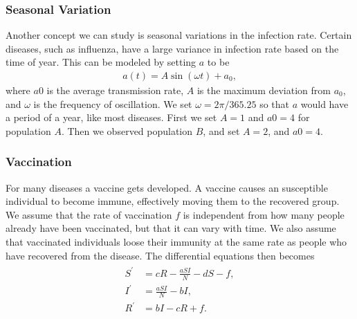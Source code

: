 \documentclass[a4paper]{article}
\let\Oldsubsubsection\subsubsection
\renewcommand{\subsubsection}{\FloatBarrier\Oldsubsubsection}
\begin{document}
	
	\subsubsection{Seasonal Variation}
	
	Another concept we can study is seasonal variations in the infection rate. Certain diseases, such as influenza, have a large variance in infection rate based on the time of year. This can be modeled by setting $a$ to be
	\begin{align}
	a ( t ) = A \sin ( \omega t ) + a _ { 0 },
	\end{align}
	where $a0$ is the average transmission rate, $A$ is the maximum deviation from $a_0$, and $\omega$ is the frequency of oscillation. We set $\omega = 2 \pi/365.25$ so that $a$ would have a period of a year, like most diseases. First we set $A=1$ and $a0=4$ for population $A$. Then we observed population $B$, and set $A=2$, and $a0=4$. 
	
	\subsubsection{Vaccination}
	
	For many diseases a vaccine gets developed. A vaccine causes an susceptible individual to become immune, effectively moving them to the recovered group. We assume that the rate of vaccination $f$ is independent from how many people already have been vaccinated, but that it can vary with time. We also assume that vaccinated individuals loose their immunity at the same rate as people who have recovered from the disease. The differential equations then becomes
	\begin{align} 
	\begin{split} 
	S ^ { \prime } & = c R - \frac { a S I } { N } - d S -f, \\ 
	I ^ { \prime } & = \frac { a S I } { N } - b I , \\ 
	R ^ { \prime } & = b I - c R + f.
	\end{split} 
	\end{align}
	
\end{document}
